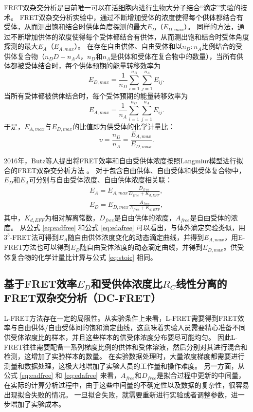 FRET双杂交分析是目前唯一可以在活细胞内进行生物大分子结合“滴定”实验的技术。
FRET双杂交分析实验中，通过不断增加受体的浓度使得每个供体都结合有受体，从而测出饱和结合时供体角度探测的最大$E_D$（$E_{D,max}$）。
同样的方法，通过不断增加供体的浓度使得每个受体都结合有供体，从而测出饱和结合时受体角度探测的最大$E_A$（$E_{A,max}$）。
在存在自由供体、自由受体和以$n_D:n_A$比例结合的受供体复合物（$n_DD-n_AA$，$n_D$和$n_A$是供体和受体在复合物中的数量），当所有供体都被受体结合时，每个供体预期的能量转移效率为
\begin{equation}
    E_{D,max}=\frac{1}{n_D} \sum_{i=1}^{n_D} \sum_{j=1}^{n_A} E_{ij}.
\end{equation}
当所有受体都被供体结合时，每个受体预期的能量转移效率为
\begin{equation}
    E_{A,max}=\frac{1}{n_A} \sum_{i=1}^{n_D} \sum_{j=1}^{n_A} E_{ij}.
\end{equation}
于是，$E_{A,max}$与$E_{D,max}$的比值即为供受体的化学计量比：
\begin{equation}
    \upsilon = \frac{n_D}{n_A} = \frac{E_{A,max}}{E_{D,max}}. \label{eq:stoic}
\end{equation}

2016年，Butz等人提出将FRET效率和自由受供体浓度按照Langmiur模型进行拟合的FRET双杂交分析方法 。
对于包含自由供体、自由受体和供受体复合物中，$E_D$和$E_A$可分别与自由受体浓度、自由供体浓度相关联：
\begin{align}
    E_A = E_{A,max} \frac{D_{free}}{D_{free}+K_{d,EFF}}, \label{eq:eadfree} \\
    E_D = E_{D,max} \frac{A_{free}}{A_{free}+K_{d,EFF}}, \label{eq:edafree}
\end{align}
其中，$K_{d,EFF}$为相对解离常数，$D_{free}$是自由供体的浓度，$A_{free}$是自由受体的浓度。
从公式 \ref{eq:eadfree} 和公式 \ref{eq:edafree} 可以看出，与体外滴定实验类似，用$3^3$-FRET法可得到$E_A$随自由供体浓度变化的动态滴定曲线，并得到$E_{A,max}$，用E-FRET方法也可以得到$E_D$随自由受体浓度的动态滴定曲线，并得到$E_{D,max}$。供受体复合物的化学计量比计算与公式 \ref{eq:stoic} 相同。
\fi

\subsection{\texorpdfstring{基于FRET效率$E_D$和受供体浓度比$R_C$线性分离的FRET双杂交分析（DC-FRET）}{基于FRET效率Ed和受供体浓度比Rc线性分离的FRET双杂交分析（DC-FRET）}}

\ifshowtext
L-FRET方法存在一定的局限性。从实验条件上来看，L-FRET需要得到FRET效率与自由供体/自由受体间的饱和滴定曲线，这意味着实验人员需要精心准备不同供受体浓度比的样本，并且这些样本的供受体浓度分布要尽可能均匀。
因此L-FRET往往需要配备一系列梯度比例的供体和受体溶液，然后分别对其进行混合和检测，这增加了实验样本的数量。
在实验数据处理时，大量浓度梯度都需要进行测量和数据处理，这极大地增加了实验人员的工作量和操作难度。
另一方面，从公式 \ref{eq:eadfree} 和 \ref{eq:edafree} 来看，$A_{free}$和$D_{free}$是拟合过程中更新的中间量，在实际的计算分析过程中，由于这些中间量的不确定性以及数据的复杂性，很容易出现拟合失败的情况。
一旦拟合失败，就需要重新进行实验或者调整参数，进一步增加了实验成本。

